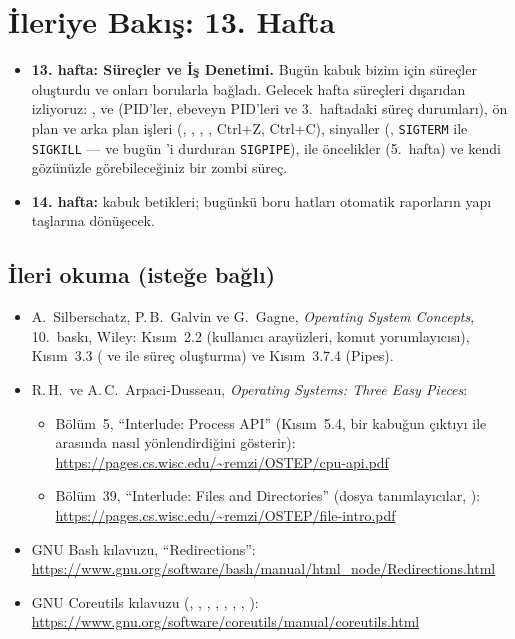 \section{İleriye Bakış: 13. Hafta}

\begin{itemize}
  \item \textbf{13. hafta: Süreçler ve İş Denetimi.} Bugün kabuk bizim için süreçler oluşturdu ve onları borularla bağladı. Gelecek hafta süreçleri dışarıdan izliyoruz: ,  ve  (PID'ler, ebeveyn PID'leri ve 3.~haftadaki süreç durumları), ön plan ve arka plan işleri (\cmd{\&}, , , , Ctrl+Z, Ctrl+C), sinyaller (, \texttt{SIGTERM} ile \texttt{SIGKILL} --- ve bugün 'i durduran \texttt{SIGPIPE}),  ile öncelikler (5.~hafta) ve kendi gözünüzle görebileceğiniz bir zombi süreç.
  \item \textbf{14. hafta:} kabuk betikleri; bugünkü boru hatları otomatik raporların yapı taşlarına dönüşecek.
\end{itemize}

\subsection*{İleri okuma (isteğe bağlı)}
\begin{itemize}
  \item A.\ Silberschatz, P.\,B.\ Galvin ve G.\ Gagne, \emph{Operating System Concepts}, 10.\ baskı, Wiley: Kısım~2.2 (kullanıcı arayüzleri, komut yorumlayıcısı), Kısım~3.3 ( ve  ile süreç oluşturma) ve Kısım~3.7.4 (Pipes).
  \item R.\,H.\ ve A.\,C.\ Arpaci-Dusseau, \emph{Operating Systems: Three Easy Pieces}:
  \begin{itemize}
    \item Bölüm~5, ``Interlude: Process API'' (Kısım~5.4, bir kabuğun çıktıyı  ile  arasında nasıl yönlendirdiğini gösterir): \url{https://pages.cs.wisc.edu/~remzi/OSTEP/cpu-api.pdf}
    \item Bölüm~39, ``Interlude: Files and Directories'' (dosya tanımlayıcılar, ): \url{https://pages.cs.wisc.edu/~remzi/OSTEP/file-intro.pdf}
  \end{itemize}
  \item GNU Bash kılavuzu, ``Redirections'': \url{https://www.gnu.org/software/bash/manual/html_node/Redirections.html}
  \item GNU Coreutils kılavuzu (, , , , , , , ): \url{https://www.gnu.org/software/coreutils/manual/coreutils.html}
\end{itemize}
